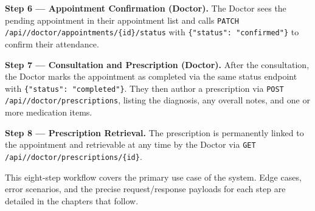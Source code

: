 \textbf{Step 6 --- Appointment Confirmation (Doctor).}
The Doctor sees the pending appointment in their appointment list and
calls
\texttt{PATCH /api/\apiversion{}/doctor/appointments/\{id\}/status}
with \texttt{\{"status": "confirmed"\}} to confirm their attendance.

\textbf{Step 7 --- Consultation and Prescription (Doctor).}
After the consultation, the Doctor marks the appointment as completed
via the same status endpoint with \texttt{\{"status": "completed"\}}.
They then author a prescription via
\texttt{POST /api/\apiversion{}/doctor/prescriptions}, listing the
diagnosis, any overall notes, and one or more medication items.

\textbf{Step 8 --- Prescription Retrieval.}
The prescription is permanently linked to the appointment and retrievable
at any time by the Doctor via
\texttt{GET /api/\apiversion{}/doctor/prescriptions/\{id\}}.

This eight-step workflow covers the primary use case of the system. Edge
cases, error scenarios, and the precise request/response payloads for
each step are detailed in the chapters that follow.
